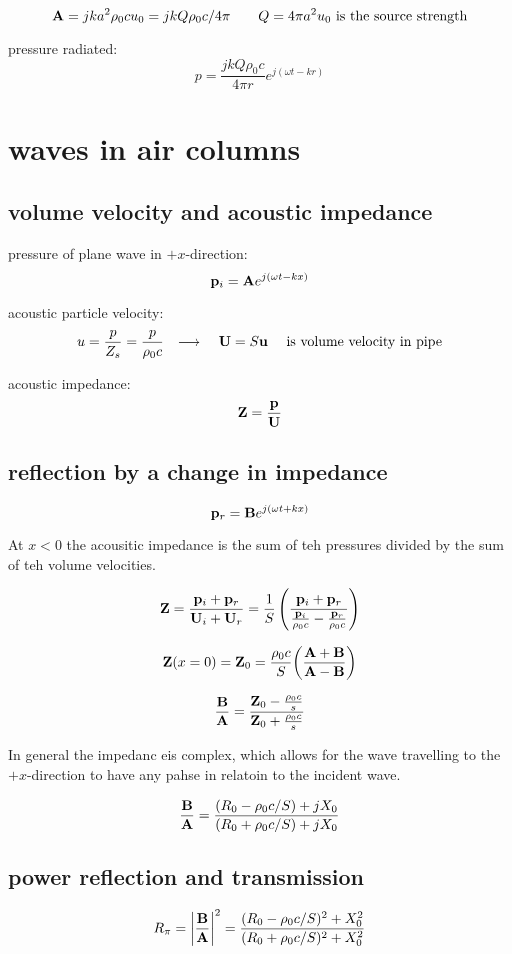 \documentclass[10pt, a4paper, twocolumn]{article}
\newcommand{\arr}{\ensuremath{\longrightarrow\ }}
\begin{document}
\[\vb A = jka^2\rho _0 cu_0=jkQ\rho _0c/4\pi
\qquad Q=4\pi a^2u_0\text{ is the source strength} \]

pressure radiated:
\[p=\frac{jkQ\rho _0c}{4\pi r}e^{j(\omega t-kr)}\]

\section{waves in air columns}
\subsection{volume velocity and acoustic impedance}

pressure of plane wave in $+x$-direction:
\[\vb p_i =\vb A e^{j(\omega t-kx)}\]

acoustic particle velocity:
\[u = \frac{p}{Z_s}=\frac{p}{\rho _0c}
\qq{\arr} \vb U = S\vb u\quad
\text{ is volume velocity in pipe} \]

acoustic impedance:
\[\vb Z = \frac{\vb p}{\vb U}\]

\subsection{reflection by a change in impedance}

\[\vb p _r = \vb B e^{j(\omega t+kx)}\]

At $x<0$ the acousitic impedance is the sum of teh pressures divided by the sum of teh volume velocities.

\[\vb Z = \frac{\vb p_i+\vb p_r}{\vb U_i+\vb U_r}
=\frac1S\left(
\frac{\vb p_i+\vb p_r}{\frac{\vb p_i}{\rho _0c}
-\frac{\vb p_r}{\rho _0c}} \right) \]

\[\vb Z(x=0)=\vb Z_0
=\frac{\rho _0c}{S}\qty(\frac{\vb A+\vb B}{\vb A-\vb B})\]

\[\frac{\vb B}{\vb A} = \frac{\vb Z_0-\frac{\rho _0c}{s}}
{\vb Z_0 + \frac{\rho _0c}{s}}\]

In general the impedanc eis complex, which allows for the wave travelling to the $+x$-direction to have any pahse in relatoin to the incident wave.

\[\frac{\vb B}{\vb A}
= \frac{(R_0-\rho _0c/S)+jX_0}{(R_0+\rho _0c/S)+jX_0} \]

\subsection{power reflection and transmission}

\[ R_\pi = \abs{\frac{\vb B}{\vb A}}^2
= \frac{(R_0-\rho _0c/S)^2+X_0^2}
{(R_0+\rho _0c/S)^2+X_0^2} \]
\end{document}
